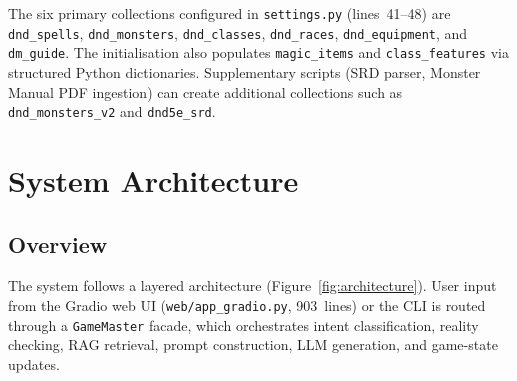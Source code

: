 \documentclass[12pt,a4paper]{article}
\begin{document}
The six primary collections configured in \texttt{settings.py}
(lines~41--48) are \texttt{dnd\_spells}, \texttt{dnd\_monsters},
\texttt{dnd\_classes}, \texttt{dnd\_races}, \texttt{dnd\_equipment}, and
\texttt{dm\_guide}. The initialisation also populates
\texttt{magic\_items} and \texttt{class\_features} via structured Python
dictionaries. Supplementary scripts (SRD parser, Monster Manual PDF
ingestion) can create additional collections such as
\texttt{dnd\_monsters\_v2} and \texttt{dnd5e\_srd}.

\section{System Architecture}
\label{sec:architecture}

\subsection{Overview}

The system follows a layered architecture (Figure~\ref{fig:architecture}).
User input from the Gradio web UI (\texttt{web/app\_gradio.py}, 903~lines)
or the CLI is routed through a \texttt{GameMaster} facade, which orchestrates
intent classification, reality checking, RAG retrieval, prompt construction,
LLM generation, and game-state updates.
\end{document}
